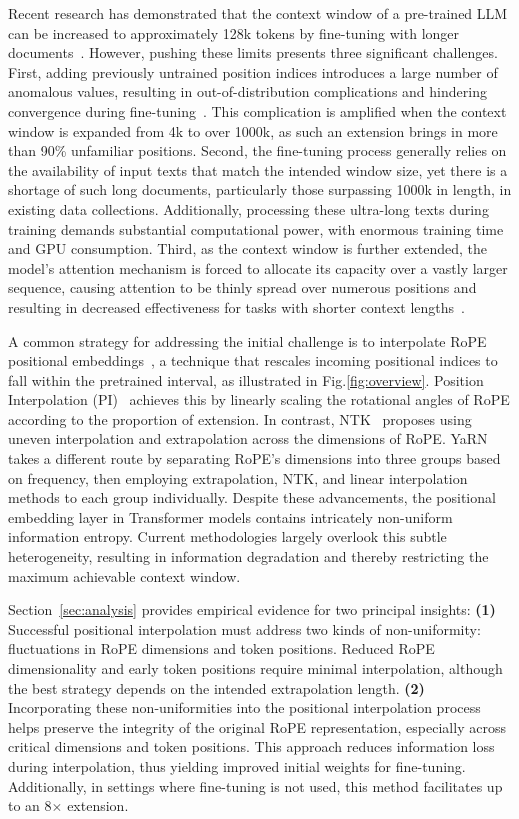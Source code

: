 Recent research has demonstrated that the context window of a pre-trained LLM can be increased to approximately 128k tokens by fine-tuning with longer documents~\cite{longlora,pi,yarn,zhang2024soaring,liu2023scaling}. However, pushing these limits presents three significant challenges. First, adding previously untrained position indices introduces a large number of anomalous values, resulting in out-of-distribution complications and hindering convergence during fine-tuning~\cite{pi}. This complication is amplified when the context window is expanded from 4k to over 1000k, as such an extension brings in more than 90\% unfamiliar positions. Second, the fine-tuning process generally relies on the availability of input texts that match the intended window size, yet there is a shortage of such long documents, particularly those surpassing 1000k in length, in existing data collections. Additionally, processing these ultra-long texts during training demands substantial computational power, with enormous training time and GPU consumption. Third, as the context window is further extended, the model’s attention mechanism is forced to allocate its capacity over a vastly larger sequence, causing attention to be thinly spread over numerous positions and resulting in decreased effectiveness for tasks with shorter context lengths~\cite{pi}.

A common strategy for addressing the initial challenge is to interpolate RoPE positional embeddings~\cite{rope,pi}, a technique that rescales incoming positional indices to fall within the pretrained interval, as illustrated in Fig.\ref{fig:overview}. Position Interpolation (PI)~\cite{pi} achieves this by linearly scaling the rotational angles of RoPE according to the proportion of extension. In contrast, NTK~\cite{ntk,dynamicntk} proposes using uneven interpolation and extrapolation across the dimensions of RoPE. YaRN~\cite{yarn} takes a different route by separating RoPE's dimensions into three groups based on frequency, then employing extrapolation, NTK, and linear interpolation methods to each group individually. Despite these advancements, the positional embedding layer in Transformer models contains intricately non-uniform information entropy. Current methodologies largely overlook this subtle heterogeneity, resulting in information degradation and thereby restricting the maximum achievable context window.

Section~\ref{sec:analysis} provides empirical evidence for two principal insights: \textbf{(1)} Successful positional interpolation must address two kinds of non-uniformity: fluctuations in RoPE dimensions and token positions. Reduced RoPE dimensionality and early token positions require minimal interpolation, although the best strategy depends on the intended extrapolation length. \textbf{(2)} Incorporating these non-uniformities into the positional interpolation process helps preserve the integrity of the original RoPE representation, especially across critical dimensions and token positions. This approach reduces information loss during interpolation, thus yielding improved initial weights for fine-tuning. Additionally, in settings where fine-tuning is not used, this method facilitates up to an 8$\times$ extension.

